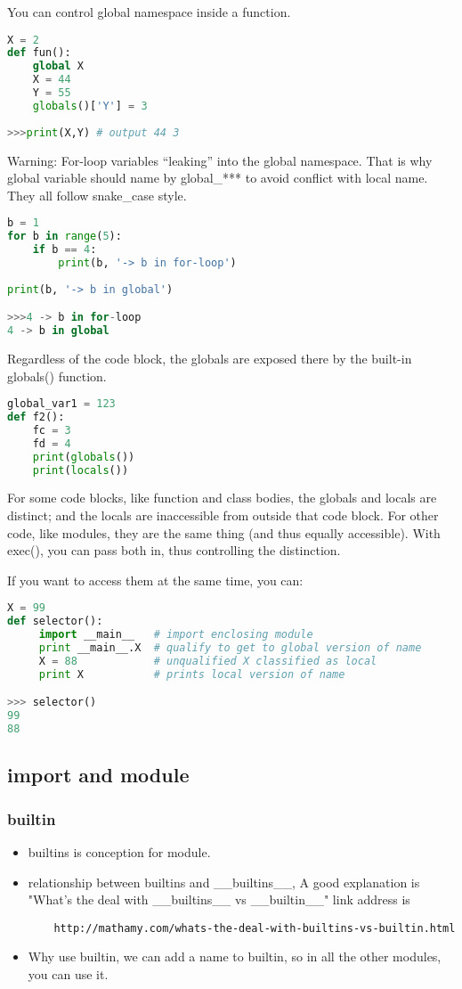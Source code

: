 \documentclass[a4paper,12pt,twoside]{book}
\begin{document}
You can control global namespace inside a function.
\begin{lstlisting}[frame=single, language=Python]
X = 2
def fun():
	global X
	X = 44
	Y = 55
	globals()['Y'] = 3
	
>>>print(X,Y) # output 44 3
\end{lstlisting}  

Warning: For-loop variables “leaking” into the global namespace. That is why global variable should name by global\_*** to avoid conflict with local name. They all follow snake\_case style.
\begin{lstlisting}[frame=single, language=Python]
b = 1
for b in range(5):
	if b == 4:
		print(b, '-> b in for-loop')
	
print(b, '-> b in global')

>>>4 -> b in for-loop
4 -> b in global
\end{lstlisting}  

Regardless of the code block, the globals are exposed there by the built-in globals() function. 
\begin{lstlisting}[frame=single, language=Python]
global_var1 = 123
def f2():
	fc = 3
	fd = 4
	print(globals())
	print(locals())
\end{lstlisting}  
	
For some code blocks, like function and class bodies, the globals and locals are distinct; and the locals are inaccessible from outside that code block. For other code, like modules, they are the same thing (and thus equally accessible). With exec(), you can pass both in, thus controlling the distinction.

If you want to access them at the same time, you can:
\begin{lstlisting}[frame=single, language=python]
X = 99
def selector():
     import __main__   # import enclosing module
     print __main__.X  # qualify to get to global version of name
     X = 88            # unqualified X classified as local
     print X           # prints local version of name

>>> selector()
99
88
\end{lstlisting} 


\subsection{import and module}
\subsubsection{builtin}
\begin{itemize}
	\item builtins is conception for module.
	\item relationship between builtins and \_\_builtins\_\_, A good explanation is "What's the deal with \_\_builtins\_\_ vs \_\_builtin\_\_" link address is \begin{verbatim}
	http://mathamy.com/whats-the-deal-with-builtins-vs-builtin.html \end{verbatim}
	\item Why use builtin, we can add a name to builtin,  so in all the other modules, you can use it.
\end{itemize}
\end{document}
